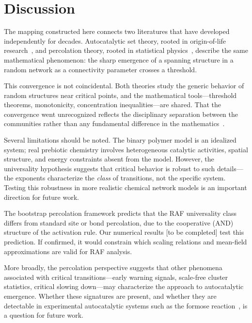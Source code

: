 \documentclass[preprint,12pt]{elsarticle}
\begin{document}
\section{Discussion}
\label{sec:discussion}

The mapping constructed here connects two literatures that
have developed independently for decades. Autocatalytic
set theory, rooted in origin-of-life
research~\cite{kauffman1986autocatalytic,hordijk2004detecting},
and percolation theory, rooted in statistical
physics~\cite{stauffer2018introduction}, describe the same
mathematical phenomenon: the sharp emergence of a
spanning structure in a random network as a connectivity
parameter crosses a threshold.

This convergence is not coincidental. Both theories study
the generic behavior of random structures near critical
points, and the mathematical tools---threshold theorems,
monotonicity, concentration inequalities---are shared.
That the convergence went unrecognized reflects the
disciplinary separation between the communities rather
than any fundamental difference in the
mathematics~\cite{stephenson2026cross}.

Several limitations should be noted. The binary polymer
model is an idealized system; real prebiotic chemistry
involves heterogeneous catalytic activities, spatial
structure, and energy constraints absent from the model.
However, the universality hypothesis suggests that
critical behavior is robust to such details---the
exponents characterize the \emph{class} of transitions,
not the specific system. Testing this robustness in
more realistic chemical network models is an important
direction for future work.

The bootstrap percolation framework predicts that the
RAF universality class differs from standard site or
bond percolation, due to the cooperative (AND) structure
of the activation rule. Our numerical results
[to be completed] test this prediction. If confirmed,
it would constrain which scaling relations and mean-field
approximations are valid for RAF analysis.

More broadly, the percolation perspective suggests that
other phenomena associated with critical transitions---early
warning signals, scale-free cluster statistics,
critical slowing down---may characterize the approach
to autocatalytic emergence. Whether these signatures are
present, and whether they are detectable in experimental
autocatalytic systems such as the formose
reaction~\cite{hordijk2018autocatalytic}, is a question
for future work.
\end{document}
